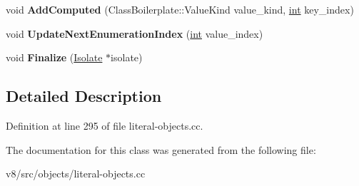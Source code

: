 \begin{DoxyCompactItemize}
void {\bfseries Add\+Computed} (Class\+Boilerplate\+::\+Value\+Kind value\+\_\+kind, \mbox{\hyperlink{classint}{int}} key\+\_\+index)
\item 
\mbox{\label{classv8_1_1internal_1_1ObjectDescriptor_a11cb323dbe53d462b7f272580ea4c033}} 
void {\bfseries Update\+Next\+Enumeration\+Index} (\mbox{\hyperlink{classint}{int}} value\+\_\+index)
\item 
\mbox{\label{classv8_1_1internal_1_1ObjectDescriptor_ac286f8dc33939993347f8e9eb12770c0}} 
void {\bfseries Finalize} (\mbox{\hyperlink{classv8_1_1internal_1_1Isolate}{Isolate}} $\ast$isolate)
\end{DoxyCompactItemize}


\subsection{Detailed Description}


Definition at line 295 of file literal-\/objects.\+cc.



The documentation for this class was generated from the following file\+:\begin{DoxyCompactItemize}
\item 
v8/src/objects/literal-\/objects.\+cc\end{DoxyCompactItemize}
